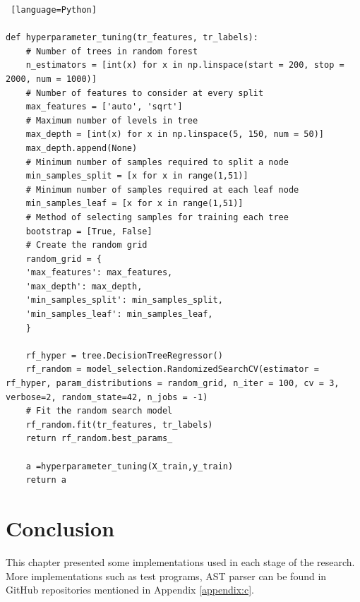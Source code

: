 \begin{lstlisting} [language=Python]

def hyperparameter_tuning(tr_features, tr_labels):
	# Number of trees in random forest
	n_estimators = [int(x) for x in np.linspace(start = 200, stop = 2000, num = 1000)]
	# Number of features to consider at every split
	max_features = ['auto', 'sqrt']
	# Maximum number of levels in tree
	max_depth = [int(x) for x in np.linspace(5, 150, num = 50)]
	max_depth.append(None)
	# Minimum number of samples required to split a node
	min_samples_split = [x for x in range(1,51)]
	# Minimum number of samples required at each leaf node
	min_samples_leaf = [x for x in range(1,51)]
	# Method of selecting samples for training each tree
	bootstrap = [True, False]
	# Create the random grid
	random_grid = {
	'max_features': max_features,
	'max_depth': max_depth,
	'min_samples_split': min_samples_split,
	'min_samples_leaf': min_samples_leaf,
	}
	
	rf_hyper = tree.DecisionTreeRegressor()
	rf_random = model_selection.RandomizedSearchCV(estimator = rf_hyper, param_distributions = random_grid, n_iter = 100, cv = 3, verbose=2, random_state=42, n_jobs = -1)
	# Fit the random search model
	rf_random.fit(tr_features, tr_labels)
	return rf_random.best_params_
	
	a =hyperparameter_tuning(X_train,y_train)
	return a

\end{lstlisting}


\section{Conclusion}

This chapter presented some implementations used in each stage of the research. More implementations such as test programs, AST parser can be found in GitHub repositories mentioned in Appendix \ref{appendix:c}.
